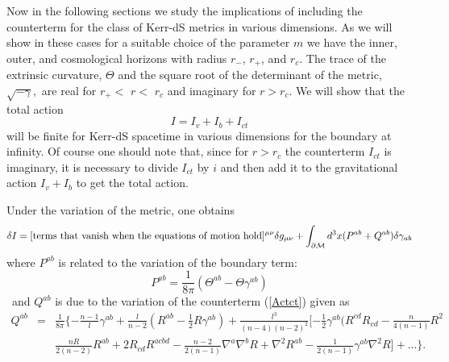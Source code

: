 \documentclass[a4paper,12pt,onecolumn]{revtex4}
\begin{document}
Now in the following sections we study the implications of including the
counterterm for the class of Kerr-dS metrics in various dimensions. As we
will show in these cases for a suitable choice of the parameter $m$ we have
the inner, outer, and cosmological horizons with radius $r_{-}$, $r_{+}$, and $%
r_c$. The trace of the extrinsic curvature, $\Theta $ and the square root of
the determinant of the metric, $\sqrt{-\gamma },$ are real for $r_{+}<$ $r<$
$r_c$ and imaginary for $r>r_c$. We will show that the total action
\begin{equation}
I=I_v+I_b+I_{ct}  \label{totact}
\end{equation}
will be finite for Kerr-dS spacetime in various dimensions for the
boundary at infinity. Of course one should note that, since for
$r>r_c$ the counterterm $I_{ct}$ is imaginary, it is necessary to
divide $I_{ct}$ by $i$ and then add it to the gravitational action
$I_v+I_b$ to get the total action.

Under the variation of the metric, one obtains
\begin{equation}
\delta I=[\hbox{terms that vanish when the equations of motion hold}]^{\mu
\nu }\delta g_{\mu \nu }+\int_{\partial \mathcal{M}}d^3x(P^{ab}+Q^{ab})%
\delta \gamma _{ab}  \label{varact}
\end{equation}
where $P^{ab}$ is related to the variation of the boundary term:
\begin{equation}
P^{ab}=\frac 1{8\pi }(\Theta ^{ab}-\Theta \gamma ^{ab})  \label{stres1}
\end{equation}
\ and $Q^{ab}$ is due to the variation of the counterterm
(\ref{Actct}) given as
\begin{eqnarray}
Q^{ab} &=&\frac 1{8\pi }\{-\frac{n-1}l\gamma ^{ab}+\frac l{n-2}(R^{ab}-\frac
12R\gamma ^{ab})+\frac{l^3}{(n-4)(n-2)^2}[-\frac 12\gamma
^{ab}(R^{cd}R_{cd}-\frac n{4(n-1)}R^2  \nonumber \\
&&\frac{nR}{2(n-2)}R^{ab}+2R_{cd}R^{acbd}-\frac{n-2}{2(n-1)}\nabla
^a\nabla ^bR+\nabla ^2R^{ab}-\frac 1{2(n-1)}\gamma ^{ab}\nabla
^2R]+...\}. \label{stres2}
\end{eqnarray}
\end{document}

